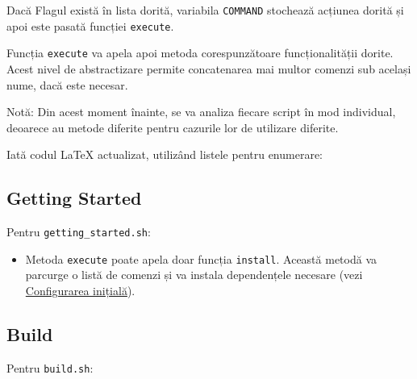 Dacă Flagul există în lista dorită, variabila \texttt{COMMAND} stochează acțiunea dorită și apoi este pasată funcției \texttt{execute}.

Funcția \texttt{execute} va apela apoi metoda corespunzătoare funcționalității dorite. Acest nivel de abstractizare permite concatenarea mai multor comenzi sub același nume, dacă este necesar.

Notă: Din acest moment înainte, se va analiza fiecare script în mod individual, deoarece au metode diferite pentru cazurile lor de utilizare diferite.

Iată codul LaTeX actualizat, utilizând listele pentru enumerare:

\subsection{Getting Started}
Pentru \texttt{getting\_started.sh}:

\begin{itemize}
    \item Metoda \texttt{execute} poate apela doar funcția \texttt{install}. Această metodă va parcurge o listă de comenzi și va instala dependențele necesare (vezi \hyperref[first-time-setup]{Configurarea inițială}).
\end{itemize}

\subsection{Build}
Pentru \texttt{build.sh}:

